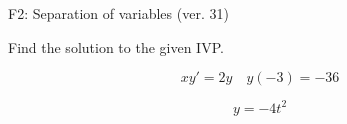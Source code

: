 \begin{exercise}
  \begin{exerciseTitle}F2: Separation of variables (ver. 31)\end{exerciseTitle}
  \begin{exerciseStatement}
    
Find the solution to the given IVP.

    
\[xy'= 2 y \hspace{1em} y( -3 ) = -36\]

  \end{exerciseStatement}
  \begin{exerciseAnswer}
    
\[y= -4 t^ 2\]

  \end{exerciseAnswer}
\end{exercise}